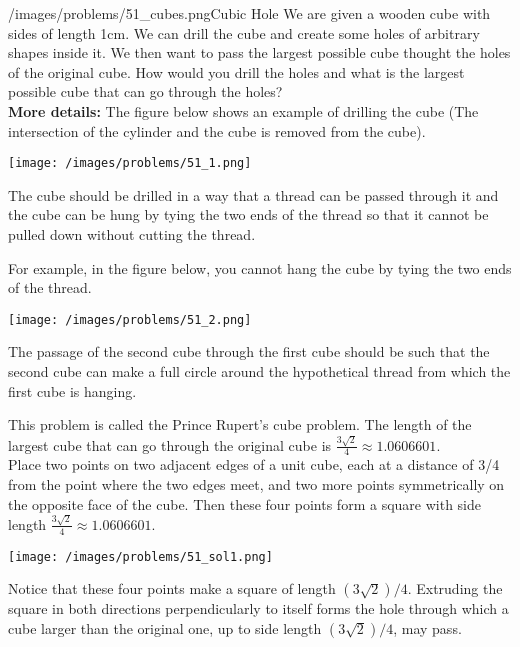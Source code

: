 \begin{problem}{/images/problems/51_cubes.png}{Cubic Hole}  We are given a wooden cube with sides of length 1cm. We can drill the cube and create some holes of arbitrary shapes inside it. We then want to pass the largest possible cube thought the holes of the original cube. How would you drill the holes and what is the largest possible cube that can go through the holes?\\[0.2cm]
	
\textbf{More details:} 
The figure below shows an example of drilling the cube (The intersection of the cylinder and the cube is removed from the cube).
\begin{center}
	\texttt{[image: /images/problems/51\_1.png]}
\end{center}
The cube should be drilled in a way that a thread can be passed through it and the cube can be hung by tying the two ends of the thread so that it cannot be pulled down without cutting the thread.

For example, in the figure below, you cannot hang the cube by tying the two ends of the thread.
\begin{center}
\texttt{[image: /images/problems/51\_2.png]}
\end{center}

The passage of the second cube through the first cube should be such that the second cube can make a full circle around the hypothetical thread from which the first cube is hanging.
\end{problem}
\begin{solution}
This problem is called the Prince Rupert's cube problem. The length of the largest cube that can go through the original cube is $\frac{3\sqrt{2}}{4} \approx 1.0606601$.\\[0.2cm]

Place two points on two adjacent edges of a unit cube, each at a distance of 3/4 from the point where the two edges meet, and two more points symmetrically on the opposite face of the cube. Then these four points form a square with side length
$\frac{3\sqrt{2}}{4} \approx 1.0606601.$

\begin{center}
	\texttt{[image: /images/problems/51\_sol1.png]}
\end{center}

Notice that these four points make a square of length $(3\sqrt{2})/4$. Extruding the square in both directions perpendicularly to itself forms the hole through which a cube larger than the original one, up to side length $(3\sqrt{2})/4$, may pass.

\end{solution}
